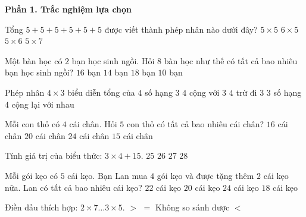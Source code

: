 \textbf{Phần 1. Trắc nghiệm lựa chọn}

\begin{ex} %
Tổng $5 + 5 + 5 + 5 + 5 + 5$ được viết thành phép nhân nào dưới đây?
\choice
{$5 \times 5$}
{$6 \times 5$}
{\True $5 \times 6$}
{$5 \times 7$}
\end{ex}

\begin{ex} %
Một bàn học có $2$ bạn học sinh ngồi. Hỏi $8$ bàn học như thế có tất cả bao nhiêu bạn học sinh ngồi?
\choice
{\True $16$ bạn}
{$14$ bạn}
{$18$ bạn}
{$10$ bạn}
\end{ex}

\begin{ex} %
Phép nhân $4 \times 3$ biểu diễn tổng của
\choice
{$4$ số hạng $3$}
{$4$ cộng với $3$}
{$4$ trừ đi $3$}
{\True $3$ số hạng $4$ cộng lại với nhau}
\end{ex}

\begin{ex} %
Mỗi con thỏ có $4$ cái chân. Hỏi $5$ con thỏ có tất cả bao nhiêu cái chân?
\choice
{$16$ cái chân}
{\True $20$ cái chân}
{$24$ cái chân}
{$15$ cái chân}
\end{ex}

\begin{ex} %
Tính giá trị của biểu thức: $3 \times 4 + 15$.
\choice
{$25$}
{$26$}
{\True $27$}
{$28$}
\end{ex}

\begin{ex} %
Mỗi gói kẹo có $5$ cái kẹo. Bạn Lan mua $4$ gói kẹo và được tặng thêm $2$ cái kẹo nữa. Lan có tất cả bao nhiêu cái kẹo?
\choice
{\True $22$ cái kẹo}
{$20$ cái kẹo}
{$24$ cái kẹo}
{$18$ cái kẹo}
\end{ex}

\begin{ex} %
Điền dấu thích hợp: $2 \times 7 \dots 3 \times 5$.
\choice
{$>$}
{$=$}
{Không so sánh được}
{\True $<$}
\end{ex}

